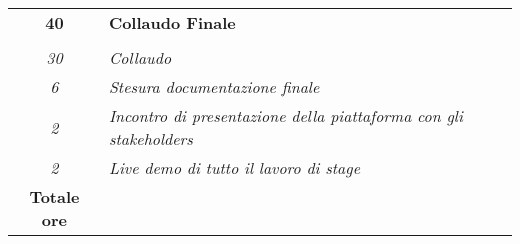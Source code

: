 \begin{tabularx}{\textwidth}{|c|X|}
    \textbf{40} & \textbf{Collaudo Finale}  \\ \hdashline 
    \multirow{4}{0cm}\\ 
    \textit{30} & 
    \textit{Collaudo} \\
    \textit{6} & 
    \textit{Stesura documentazione finale} \\
    \textit{2} & 
    \textit{Incontro di presentazione della piattaforma con gli stakeholders} \\
    \textit{2} & 
    \textit{Live demo di tutto il lavoro di stage} \\
    \hline
	
	\textbf{Totale ore} & \multicolumn{1}{|c|}{\textbf{\totaleOre}} \\\hline
	
	
\end{tabularx}